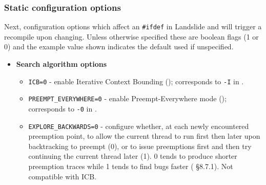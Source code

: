 \subsubsection{Static configuration options}
\label{sec:landslide-staticconfig}

Next, configuration options which affect an {\tt \#ifdef} in Landslide and will trigger a recompile upon changing.
Unless otherwise specified these are boolean flags (1 or 0) and the example value shown indicates the default used if unspecified.

\begin{itemize}
\item {\bf Search algorithm options}
\begin{itemize}
	\item {\tt ICB=0} - enable Iterative Context Bounding (\sect{\ref{sec:landslide-icb}});
		corresponds to {\tt -I} in \sect{\ref{sec:landslide-quicksand-options}}.
	\item {\tt PREEMPT\_EVERYWHERE=0} - enable Preempt-Everywhere mode (\sect{\ref{sec:quicksand-eval}});
		corresponds to {\tt -0} in \sect{\ref{sec:landslide-quicksand-options}}.
	\item {\tt EXPLORE\_BACKWARDS=0} - configure whether, at each newly encountered preemption point,
		to allow the current thread to run first then later upon backtracking to preempt (0),
		or to issue preemptions first and then try continuing the current thread later (1).
		0 tends to produce shorter preemption traces while 1 tends to find bugs faster (\cite{landslide} \S{}8.7.1).
		Not compatible with ICB.
\end{itemize}


\end{itemize}

